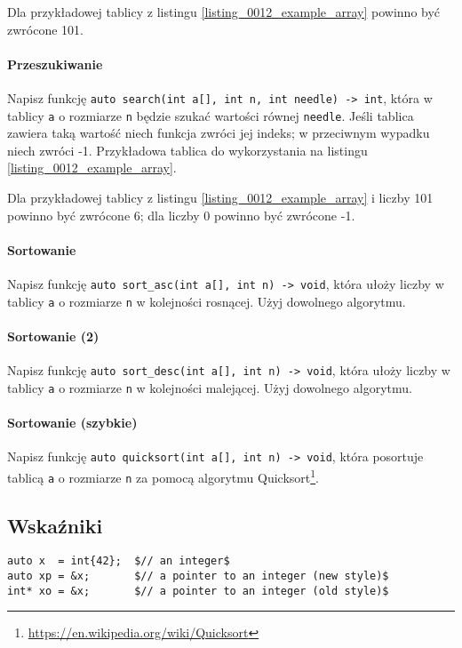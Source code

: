 \documentclass[11pt,a4paper,titlepage,onecolumn]{article}
\begin{document}
Dla przykładowej tablicy z listingu \ref{listing_0012_example_array} powinno być
zwrócone 101.

\paragraph{Przeszukiwanie} Napisz funkcję \texttt{auto search(int a[], int n,
int needle) -> int}, która w tablicy \texttt{a} o rozmiarze \texttt{n} będzie
szukać wartości równej \texttt{needle}. Jeśli tablica zawiera taką wartość niech
funkcja zwróci jej indeks; w przeciwnym wypadku niech zwróci -1. Przykładowa
tablica do wykorzystania na listingu \ref{listing_0012_example_array}.

Dla przykładowej tablicy z listingu \ref{listing_0012_example_array} i liczby
101 powinno być zwrócone 6; dla liczby 0 powinno być zwrócone -1.

\paragraph{Sortowanie} Napisz funkcję \texttt{auto sort\_asc(int a[], int n) ->
void}, która ułoży liczby w tablicy \texttt{a} o rozmiarze \texttt{n} w
kolejności rosnącej. Użyj dowolnego algorytmu.

\paragraph{Sortowanie (2)} Napisz funkcję \texttt{auto sort\_desc(int a[], int n) ->
void}, która ułoży liczby w tablicy \texttt{a} o rozmiarze \texttt{n} w
kolejności malejącej. Użyj dowolnego algorytmu.

\paragraph{Sortowanie (szybkie)} Napisz funkcję \texttt{auto quicksort(int a[], int n) ->
void}, która posortuje tablicą \texttt{a} o rozmiarze \texttt{n} za pomocą
algorytmu Quicksort\footnote{\url{https://en.wikipedia.org/wiki/Quicksort}}.

\subsection{Wskaźniki}

\begin{lstlisting}[caption={pobranie wskaźnika},
    captionpos=b,
    label=listing_howto_address_of]
auto x  = int{42};  $// an integer$
auto xp = &x;       $// a pointer to an integer (new style)$
int* xo = &x;       $// a pointer to an integer (old style)$
\end{lstlisting}
\end{document}
